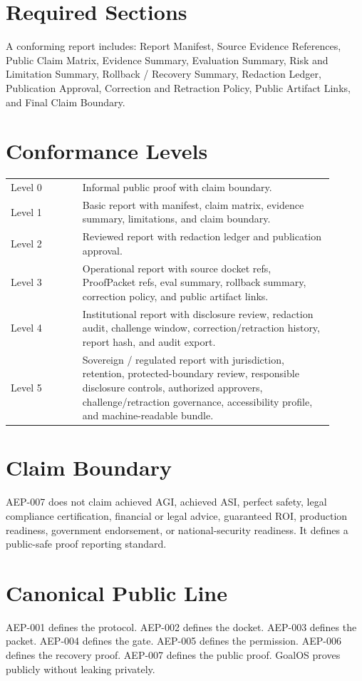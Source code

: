 \documentclass[11pt]{article}
\begin{document}
\section{Required Sections}
A conforming report includes: Report Manifest, Source Evidence References, Public Claim Matrix, Evidence Summary, Evaluation Summary, Risk and Limitation Summary, Rollback / Recovery Summary, Redaction Ledger, Publication Approval, Correction and Retraction Policy, Public Artifact Links, and Final Claim Boundary.
\section{Conformance Levels}
\begin{longtable}{p{0.20\linewidth}p{0.70\linewidth}}
Level 0 & Informal public proof with claim boundary.\\
Level 1 & Basic report with manifest, claim matrix, evidence summary, limitations, and claim boundary.\\
Level 2 & Reviewed report with redaction ledger and publication approval.\\
Level 3 & Operational report with source docket refs, ProofPacket refs, eval summary, rollback summary, correction policy, and public artifact links.\\
Level 4 & Institutional report with disclosure review, redaction audit, challenge window, correction/retraction history, report hash, and audit export.\\
Level 5 & Sovereign / regulated report with jurisdiction, retention, protected-boundary review, responsible disclosure controls, authorized approvers, challenge/retraction governance, accessibility profile, and machine-readable bundle.\\
\end{longtable}
\section{Claim Boundary}
AEP-007 does not claim achieved AGI, achieved ASI, perfect safety, legal compliance certification, financial or legal advice, guaranteed ROI, production readiness, government endorsement, or national-security readiness. It defines a public-safe proof reporting standard.
\section*{Canonical Public Line}
AEP-001 defines the protocol. AEP-002 defines the docket. AEP-003 defines the packet. AEP-004 defines the gate. AEP-005 defines the permission. AEP-006 defines the recovery proof. AEP-007 defines the public proof. GoalOS proves publicly without leaking privately.
\end{document}
